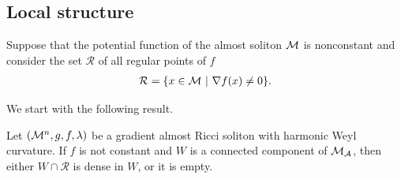 \subsection{Local structure}

Suppose that the potential function of the almost soliton $\mathcal{M}$ is nonconstant and consider the set $\mathcal{R}$ of all regular points of $f$
\begin{align*}
	\mathcal{R}=\{x\in \mathcal{M} \ | \ \nabla f(x)\neq0\}.
\end{align*}

We start with the following result.
\begin{lema}\label{denseempty}
	Let $(\mathcal{M}^{n},g,f,\lambda)$ be a gradient almost Ricci soliton with harmonic Weyl curvature. If $f$ is not constant and $W$ is a connected component of $\mathcal{M}_{\mathcal{A}}$, then either $W\cap\mathcal{R}$ is dense in $W$, or it is empty.
\end{lema}
	
